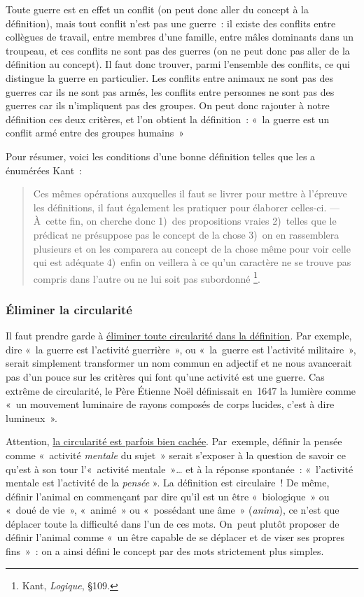 \documentclass[a4paper,12pt]{article}
\begin{document}
Toute guerre est en effet un conflit (on peut donc aller du concept à la
définition), mais tout conflit n'est pas une guerre : il existe des
conflits entre collègues de travail, entre membres d'une famille, entre
mâles dominants dans un troupeau, et ces conflits ne sont pas des
guerres (on ne peut donc pas aller de la définition au concept). Il faut
donc trouver, parmi l'ensemble des conflits, ce qui distingue la guerre
en particulier. Les conflits entre animaux ne sont pas des guerres car
ils ne sont pas armés, les conflits entre personnes ne sont pas des
guerres car ils n'impliquent pas des groupes. On peut donc rajouter à
notre définition ces deux critères, et l'on obtient la définition : « la
guerre est un conflit armé entre des groupes humains »

Pour résumer, voici les conditions d'une bonne définition telles que les
a énumérées Kant :
\begin{quote}
Ces mêmes opérations auxquelles il faut se livrer pour mettre à
l'épreuve les définitions, il faut également les pratiquer pour
élaborer celles-ci. --- À cette fin, on cherche donc 1) des
propositions vraies 2) telles que le prédicat ne présuppose pas le
concept de la chose 3) on en rassemblera plusieurs et on les comparera
au concept de la chose même pour voir celle qui est adéquate 4) enfin
on veillera à ce qu'un caractère ne se trouve pas compris dans l'autre
ou ne lui soit pas subordonné \footnote{Kant, \emph{Logique}, §109.}.
\end{quote}

\subsubsection{Éliminer la circularité}
\label{sec-2-2-2}

Il faut prendre garde à \uline{éliminer toute circularité dans la définition}.
Par exemple, dire « la guerre est l'activité guerrière », ou « la guerre
est l'activité militaire », serait simplement transformer un nom commun
en adjectif et ne nous avancerait pas d'un pouce sur les critères qui
font qu'une activité est une guerre. Cas extrême de circularité, le Père
Étienne Noël définissait en 1647 la lumière comme « un mouvement
luminaire de rayons composés de corps lucides, c'est à dire lumineux ».

Attention, \uline{la circularité est parfois bien cachée}. Par exemple,
définir la pensée comme « activité \emph{mentale} du sujet » serait s'exposer
à la question de savoir ce qu'est à son tour l'« activité mentale »\ldots{}
et à la réponse spontanée : « l'activité mentale est l'activité de la
\emph{pensée} ». La définition est circulaire ! De même, définir l'animal en
commençant par dire qu'il est un être « biologique » ou « doué de vie »,
« animé » ou « possédant une âme » (\emph{anima}), ce n'est que déplacer
toute la difficulté dans l'un de ces mots. On peut plutôt proposer de
définir l'animal comme « un être capable de se déplacer et de viser ses
propres fins » : on a ainsi défini le concept par des mots strictement
plus simples.
\end{document}
